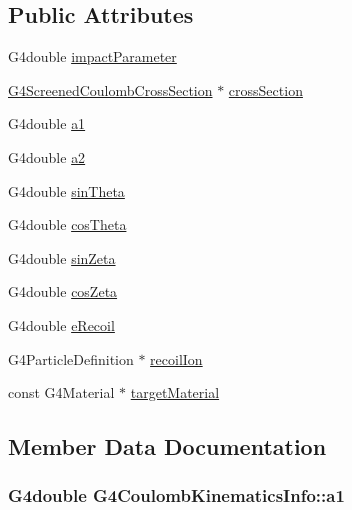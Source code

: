 \subsection*{Public Attributes}
\begin{DoxyCompactItemize}
\item 
G4double \hyperlink{structG4CoulombKinematicsInfo_ab622631d2d7c5378fd1e4d5ae4260d18}{impact\+Parameter}
\item 
\hyperlink{classG4ScreenedCoulombCrossSection}{G4\+Screened\+Coulomb\+Cross\+Section} $\ast$ \hyperlink{structG4CoulombKinematicsInfo_a98f207760b06d9ec24aafb5c4a499c7a}{cross\+Section}
\item 
G4double \hyperlink{structG4CoulombKinematicsInfo_a2839f2c5bafd5b6a973e373926087452}{a1}
\item 
G4double \hyperlink{structG4CoulombKinematicsInfo_a26c1bd40834fbab683db450f165ce31a}{a2}
\item 
G4double \hyperlink{structG4CoulombKinematicsInfo_aed45cd5ea80dd02228b0b46b51f26325}{sin\+Theta}
\item 
G4double \hyperlink{structG4CoulombKinematicsInfo_a4b434e3e3c9dddcf949db7838fd227f9}{cos\+Theta}
\item 
G4double \hyperlink{structG4CoulombKinematicsInfo_a98dcd19b562beeb8d8b4f3345b9a9a8a}{sin\+Zeta}
\item 
G4double \hyperlink{structG4CoulombKinematicsInfo_aaf59256e97f3d630a063d1f8d8294e42}{cos\+Zeta}
\item 
G4double \hyperlink{structG4CoulombKinematicsInfo_a562b3bc73310595d7766eb90b1967d67}{e\+Recoil}
\item 
G4\+Particle\+Definition $\ast$ \hyperlink{structG4CoulombKinematicsInfo_a93b6572dfdbb30fc64ce5cf99a7b9bc7}{recoil\+Ion}
\item 
const G4\+Material $\ast$ \hyperlink{structG4CoulombKinematicsInfo_a85b16b6a9ae7eea8d989fa93c365891b}{target\+Material}
\end{DoxyCompactItemize}


\subsection{Member Data Documentation}
\subsubsection[{\texorpdfstring{a1}{a1}}]{\setlength{\rightskip}{0pt plus 5cm}G4double G4\+Coulomb\+Kinematics\+Info\+::a1}\hypertarget{structG4CoulombKinematicsInfo_a2839f2c5bafd5b6a973e373926087452}{}\label{structG4CoulombKinematicsInfo_a2839f2c5bafd5b6a973e373926087452}
